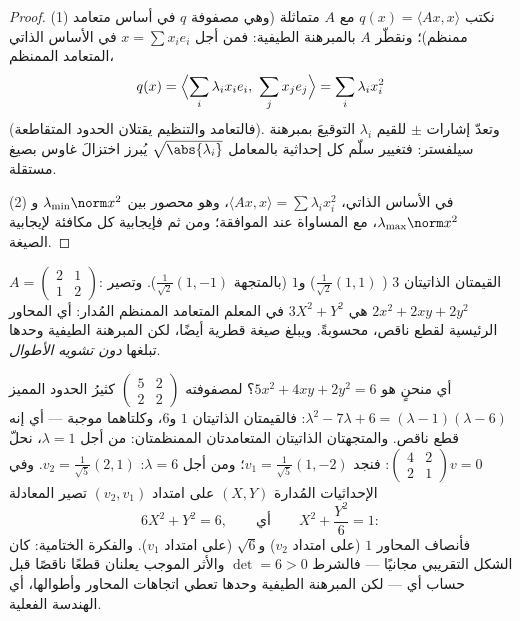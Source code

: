 \begin{proof}
(1) نكتب $q(x) = \langle A x, x\rangle$ مع $A$ متماثلة (وهي
مصفوفة $q$ في أساس متعامد ممنظم)؛ ونقطّر $A$
بالمبرهنة الطيفية: فمن أجل $x = \sum x_ie_i$ في الأساس الذاتي
المتعامد الممنظم،
\[
q(x) = \Bigl\langle \sum_i \lambda_ix_ie_i,\ \sum_j
x_je_j\Bigr\rangle = \sum_i \lambda_i x_i^2
\]
(فالتعامد والتنظيم يقتلان الحدود المتقاطعة). وتعدّ إشارات $\pm$ للقيم
$\lambda_i$ التوقيعَ بمبرهنة سيلفستر: فتغيير سلّم كل
إحداثية بالمعامل $\sqrt{\abs{\lambda_i}}$ يُبرز اختزالَ
غاوس بصيغ مستقلة.

(2) في الأساس الذاتي، $\langle Ax, x\rangle = \sum \lambda_i
x_i^2$، وهو محصور بين $\lambda_{\min}\norm x^2$ و
$\lambda_{\max}\norm x^2$، مع المساواة عند 
الموافقة؛ ومن ثم فإيجابية كل  مكافئة
لإيجابية الصيغة.
\end{proof}

\begin{example}\label{ex:b2:quadratic:spectralexample}
$A = \begin{pmatrix} 2 & 1\\ 1 & 2 \end{pmatrix}$: القيمتان الذاتيتان $3$
( $\frac{1}{\sqrt2}(1,1)$) و$1$
(بالمتجهة $\frac{1}{\sqrt2}(1,-1)$). وتصير  $2x^2 + 2xy + 2y^2$
هي $3X^2 + Y^2$ في المعلم المتعامد الممنظم المُدار: أي المحاور
الرئيسية لقطع ناقص، محسوبةً. ويبلغ  صيغة قطرية
أيضًا، لكن المبرهنة الطيفية وحدها تبلغها \emph{دون
تشويه الأطوال}.
\end{example}

\begin{example}\label{ex:b2:quadratic:ellipserun}
أي منحنٍ هو $5x^2 + 4xy + 2y^2 = 6$؟ لمصفوفته
$\begin{pmatrix} 5 & 2\\ 2 & 2\end{pmatrix}$ كثيرُ الحدود
المميز $\lambda^2 - 7\lambda + 6 = (\lambda - 1)(\lambda -
6)$: فالقيمتان الذاتيتان $1$ و$6$، وكلتاهما موجبة --- أي إنه قطع ناقص.
والمتجهتان الذاتيتان المتعامدتان الممنظمتان: من أجل $\lambda = 1$، نحلّ
$\begin{pmatrix} 4 & 2\\ 2 & 1\end{pmatrix}v = 0$: فنجد $v_1 =
\frac{1}{\sqrt5}(1, -2)$؛ ومن أجل $\lambda = 6$: $v_2 =
\frac{1}{\sqrt5}(2, 1)$. وفي الإحداثيات المُدارة $(X, Y)$
على امتداد $(v_2, v_1)$ تصير المعادلة
\[
6X^2 + Y^2 = 6,
\qquad\text{أي}\qquad
X^2 + \frac{Y^2}{6} = 1 :
\]
فأنصاف المحاور $1$ (على امتداد $v_2$) و$\sqrt6$ (على امتداد $v_1$).
والفكرة الختامية: كان الشكل التقريبي مجانيًا --- فالشرط $\det
= 6 > 0$ والأثر الموجب يعلنان قطعًا ناقصًا قبل حساب أي
 --- لكن المبرهنة الطيفية وحدها
تعطي اتجاهات المحاور وأطوالها، أي الهندسة
الفعلية.
\end{example}

